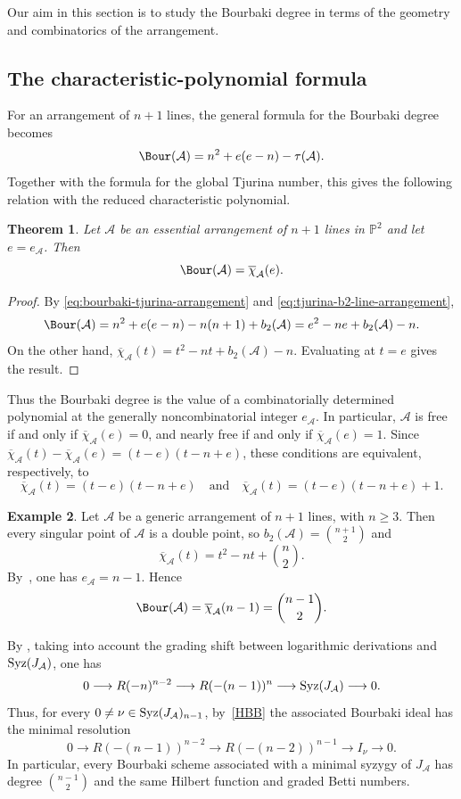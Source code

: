 \documentclass[11pt]{amsart}   %
\newtheorem{Theorem}{Theorem}[section]
\theoremstyle{definition}
\newtheorem{Example}[Theorem]{Example}
\def\syz{\mbox{\rm Syz}}
\def\NZQ{\mathbb}               %
\def\PP{{\NZQ P}}
\def\A{{\mathcal A}}
\begin{document}
Our aim in this section is to study the Bourbaki degree in terms of the geometry and combinatorics of the arrangement.
\subsection{The characteristic-polynomial formula}
\label{subsec:characteristic-polynomial-formula}

For an arrangement of $n+1$ lines, the general formula for the Bourbaki degree becomes
\begin{equation}
\label{eq:bourbaki-tjurina-arrangement}
\Bour(\A)=n^2+e(e-n)-\tau(\A).
\end{equation}
Together with the formula for the global Tjurina number, this gives the following relation with the reduced characteristic polynomial.

\begin{Theorem}
\label{thm:bourbaki-characteristic-polynomial}
Let $\A$ be an essential arrangement of $n+1$ lines in $\PP^2$ and let $e=e_\A$. Then
\[
\Bour(\A)=\overline{\chi}_\A(e).
\]
\end{Theorem}

\begin{proof}
By \eqref{eq:bourbaki-tjurina-arrangement} and \eqref{eq:tjurina-b2-line-arrangement},
\[
\Bour(\A)
=n^2+e(e-n)-n(n+1)+b_2(\A)
=e^2-ne+b_2(\A)-n.
\]
On the other hand, $\overline{\chi}_\A(t)=t^2-nt+b_2(\A)-n.$ Evaluating at $t=e$ gives the result.
\end{proof}

Thus the Bourbaki degree is the value of a combinatorially determined polynomial at the generally noncombinatorial integer $e_\A$. In particular, $\A$ is free if and only if $\overline{\chi}_\A(e)=0$, and nearly free if and only if $\overline{\chi}_\A(e)=1$. Since $\overline{\chi}_\A(t)-\overline{\chi}_\A(e)
=(t-e)(t-n+e)$, these conditions are equivalent, respectively, to
\[
\overline{\chi}_\A(t)=(t-e)(t-n+e)
\quad\text{and}\quad
\overline{\chi}_\A(t)=(t-e)(t-n+e)+1.
\]

\begin{Example}
\label{ex:generic-arrangements-bourbaki}
Let $\A$ be a generic arrangement of $n+1$ lines, with $n\geq3$. Then every singular point of $\A$ is a double point, so $b_2(\A)=\binom{n+1}{2}$ and
\[
\overline{\chi}_\A(t)=t^2-nt+\binom n2.
\]
By~\cite[Example~2.2(i)]{DimcaSernesi}, one has $e_\A=n-1$. Hence
\[
\Bour(\A)
=\overline{\chi}_\A(n-1)
=\binom{n-1}{2}.
\]

By \cite{YuzvinskyGeneric}, taking into account the grading shift between logarithmic derivations and $\syz(J_\A)$, one has
\[
0\longrightarrow R(-n)^{n-2}
\longrightarrow R(-(n-1))^n \longrightarrow\syz(J_\A)\longrightarrow0.
\]
Thus, for every $0\neq\nu\in\syz(J_\A)_{n-1}$, by~\eqref{HBB} the associated Bourbaki ideal has the minimal resolution
\[
0\longrightarrow R(-(n-1))^{n-2}
\longrightarrow R(-(n-2))^{n-1} \longrightarrow I_\nu\longrightarrow0.
\]
In particular, every Bourbaki scheme associated with a minimal syzygy of $J_\A$ has degree $\binom{n-1}{2}$ and the same Hilbert function and graded Betti numbers.
\end{Example}
\end{document}
